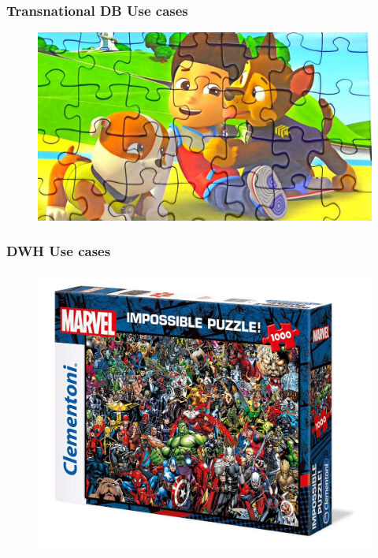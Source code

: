\begin{frame}
\frametitle{Transnational DB Use cases}
\begin{figure}[ht]
	
	\centering
			\includegraphics[width=\linewidth]{./Figures/chapter-01/baby-02.jpg}
\end{figure}
\end{frame}


\begin{frame}
\frametitle{DWH Use cases}
\begin{figure}[ht]
	
	\centering
	\includegraphics[width=\linewidth,height=.8\textheight]{./Figures/chapter-01/Marvel-03.jpg}
\end{figure}
\end{frame}


